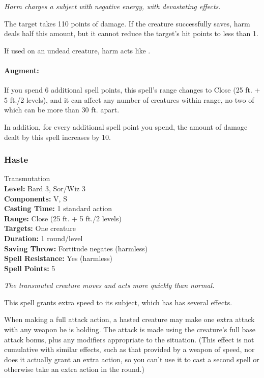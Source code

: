 \emph{Harm charges a subject with negative energy, with devastating effects.} 

The target takes 110 points of damage.
If the creature successfully saves, harm deals half this amount, but it cannot reduce the target's hit points to less than 1.

If used on an undead creature, harm acts like .

\paragraph{Augment:} If you spend 6 additional spell points, 
this spell's range changes to Close (25 ft. + 5 ft./2 levels), and it can affect any number of creatures within range,
no two of which can be more than 30 ft. apart.

In addition, for every additional spell point you spend, the amount of damage dealt by this spell increases by 10.
\subsubsection{Haste}
\label{Spell:Haste}
Transmutation
\\ \textbf{Level:} Bard 3, Sor/Wiz 3
\\ \textbf{Components:} V, S
\\ \textbf{Casting Time:} 1 standard action
\\ \textbf{Range:} Close (25 ft. + 5 ft./2 levels)
\\ \textbf{Targets:} One creature
\\ \textbf{Duration:} 1 round/level
\\ \textbf{Saving Throw:} Fortitude negates (harmless)
\\ \textbf{Spell Resistance:} Yes (harmless)
\\ \textbf{Spell Points:} 5

\emph{The transmuted creature moves and acts more quickly than normal.} 

This spell grants extra speed to its subject, which has has several effects.

When making a full attack action, a hasted creature may make one extra attack with any weapon he is holding. 
The attack is made using the creature's full base attack bonus, 
plus any modifiers appropriate to the situation. 
(This effect is not cumulative with similar effects, such as that provided by a weapon of speed, nor does it actually grant an extra action, 
so you can't use it to cast a second spell or otherwise take an extra action in the round.)

